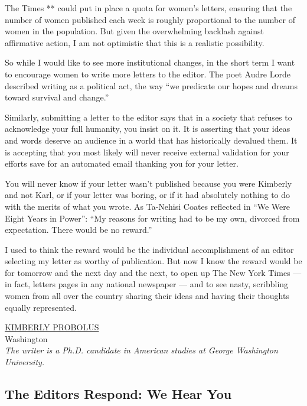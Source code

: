 The Times ** could put in place a quota for women's letters, ensuring
that the number of women published each week is roughly proportional to
the number of women in the population. But given the overwhelming
backlash against affirmative action, I am not optimistic that this is a
realistic possibility.

So while I would like to see more institutional changes, in the short
term I want to encourage women to write more letters to the editor. The
poet Audre Lorde described writing as a political act, the way ``we
predicate our hopes and dreams toward survival and change.''

Similarly, submitting a letter to the editor says that in a society that
refuses to acknowledge your full humanity, you insist on it. It is
asserting that your ideas and words deserve an audience in a world that
has historically devalued them. It is accepting that you most likely
will never receive external validation for your efforts save for an
automated email thanking you for your letter.

You will never know if your letter wasn't published because you were
Kimberly and not Karl, or if your letter was boring, or if it had
absolutely nothing to do with the merits of what you wrote. As Ta-Nehisi
Coates reflected in ``We Were Eight Years in Power'': ``My reasons for
writing had to be my own, divorced from expectation. There would be no
reward.''

I used to think the reward would be the individual accomplishment of an
editor selecting my letter as worthy of publication. But now I know the
reward would be for tomorrow and the next day and the next, to open up
The New York Times --- in fact, letters pages in any national newspaper
--- and to see nasty, scribbling women from all over the country sharing
their ideas and having their thoughts equally represented.

\href{https://americanstudies.columbian.gwu.edu/kimberly-probolus}{KIMBERLY
PROBOLUS}\\
Washington\\
\emph{The writer is a Ph.D. candidate in American studies at George
Washington University.}

\hypertarget{the-editors-respond-we-hear-you}{%
\subsection{The Editors Respond: We Hear
You}\label{the-editors-respond-we-hear-you}}

